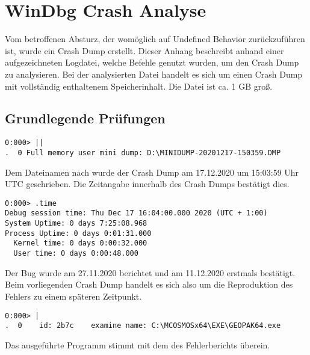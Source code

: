 \lstset{language=WinDbg}

\section{WinDbg Crash Analyse}
Vom betroffenen Absturz, der womöglich auf Undefined Behavior zurückzuführen ist, wurde ein Crash Dump erstellt.
Dieser Anhang beschreibt anhand einer aufgezeichneten Logdatei, welche Befehle genutzt wurden, um den Crash Dump zu analysieren.
Bei der analysierten Datei handelt es sich um einen Crash Dump mit vollständig enthaltenem Speicherinhalt. Die Datei ist ca. 1 GB groß.
\subsection{Grundlegende Prüfungen}
\begin{lstlisting}
0:000> ||
.  0 Full memory user mini dump: D:\MINIDUMP-20201217-150359.DMP
\end{lstlisting}
Dem Dateinamen nach wurde der Crash Dump am 17.12.2020 um 15:03:59 Uhr UTC geschrieben. Die Zeitangabe innerhalb des Crash Dumps bestätigt dies.

\begin{lstlisting}
0:000> .time
Debug session time: Thu Dec 17 16:04:00.000 2020 (UTC + 1:00)
System Uptime: 0 days 7:25:08.968
Process Uptime: 0 days 0:01:31.000
  Kernel time: 0 days 0:00:32.000
  User time: 0 days 0:00:48.000
\end{lstlisting}
Der Bug wurde am 27.11.2020 berichtet und am 11.12.2020 erstmals bestätigt. Beim vorliegenden Crash Dump handelt es sich also um die Reproduktion des Fehlers zu einem späteren Zeitpunkt.

\begin{lstlisting}
0:000> |
.  0	id: 2b7c	examine	name: C:\MCOSMOSx64\EXE\GEOPAK64.exe
\end{lstlisting}
Das ausgeführte Programm stimmt mit dem des Fehlerberichts überein.

